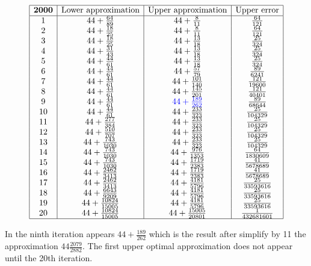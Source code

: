 \documentclass{amsart}
\begin{document}
$$\begin{array}{|c|c|c|c|}
 \hline
 {\bf 2000}&\text{Lower approximation}&\text{Upper approximation}&\text{Upper error}\\
 \hline
 1&44+\frac{64}{89}&44+\frac{8}{11}&\frac{64}{121}\\
2&44+\frac{18}{25}&44+\frac{8}{11}&\frac{64}{121}\\
3&44+\frac{18}{25}&44+\frac{13}{18}&\frac{25}{324}\\
4&44+\frac{31}{43}&44+\frac{13}{18}&\frac{25}{324}\\
5&44+\frac{44}{61}&44+\frac{13}{18}&\frac{25}{324}\\
6&44+\frac{44}{61}&44+\frac{57}{79}&\frac{89}{6241}\\
7&44+\frac{44}{61}&44+\frac{101}{140}&\frac{121}{19600}\\
8&44+\frac{44}{61}&44+\frac{145}{201}&\frac{121}{40401}\\
9&44+\frac{44}{61}&{\color{blue}44+\frac{189}{262}}&\frac{89}{68644}\\
10&44+\frac{44}{61}&44+\frac{233}{323}&\frac{25}{104329}\\
11&44+\frac{277}{384}&44+\frac{233}{323}&\frac{25}{104329}\\
12&44+\frac{510}{707}&44+\frac{233}{323}&\frac{25}{104329}\\
13&44+\frac{743}{1030}&44+\frac{233}{323}&\frac{25}{104329}\\
14&44+\frac{743}{1030}&44+\frac{976}{1353}&\frac{64}{1830609}\\
15&44+\frac{743}{1030}&44+\frac{1719}{2383}&\frac{41}{5678689}\\
16&44+\frac{2462}{3413}&44+\frac{1719}{2383}&\frac{41}{5678689}\\
17&44+\frac{2462}{3413}&44+\frac{4181}{5796}&\frac{25}{33593616}\\
18&44+\frac{6643}{9209}&44+\frac{4181}{5796}&\frac{25}{33593616}\\
19&44+\frac{10824}{15005}&44+\frac{4181}{5796}&\frac{25}{33593616}\\
20&44+\frac{10824}{15005}&44+\frac{15005}{20801}&\frac{1}{432681601}\\
 \hline
\end{array}$$

   In the ninth iteration appears $44+\frac{189}{262}$ which is the result after simplify by 11 the approximation $44\frac{2079}{2882}$. The first upper optimal approximation does not appear until the 20th iteration.
\end{document}
